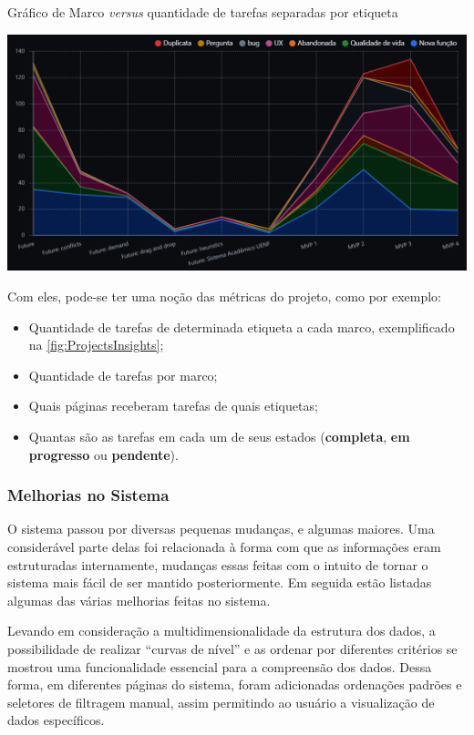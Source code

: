 \begin{MyCenteredFigure}
  \caption{Gráfico de Marco \textit{versus} quantidade de tarefas separadas por etiqueta}
  \label{fig:ProjectsInsights}
  \includegraphics[width=\textwidth]{files/img/2.02!5-desenvolvimento/2.02!5.1.4-sistema/GitHubProjects-Insights-Stacked_Line-Milestone_Label}
\end{MyCenteredFigure}

Com eles, pode-se ter uma noção das métricas do projeto, como por exemplo:

\begin{itemize}
  \item Quantidade de tarefas de determinada etiqueta a cada marco, exemplificado na \autoref{fig:ProjectsInsights};
  \item Quantidade de tarefas por marco;
  \item Quais páginas receberam tarefas de quais etiquetas;
  \item Quantas são as tarefas em cada um de seus estados (\textbf{completa}, \textbf{em progresso} ou \textbf{pendente}).
\end{itemize}

\subsubsection{Melhorias no Sistema}

O sistema passou por diversas pequenas mudanças, e algumas maiores. Uma considerável parte delas foi relacionada à forma com que as informações eram estruturadas internamente, mudanças essas feitas com o intuito de tornar o sistema mais fácil de ser mantido posteriormente. Em seguida estão listadas algumas das várias melhorias feitas no sistema.


Levando em consideração a multidimensionalidade da estrutura dos dados, a possibilidade de realizar ``curvas de nível'' e as ordenar por diferentes critérios se mostrou uma funcionalidade essencial para a compreensão dos dados. Dessa forma, em diferentes páginas do sistema, foram adicionadas ordenações padrões e seletores de filtragem manual, assim permitindo ao usuário a visualização de dados específicos.

